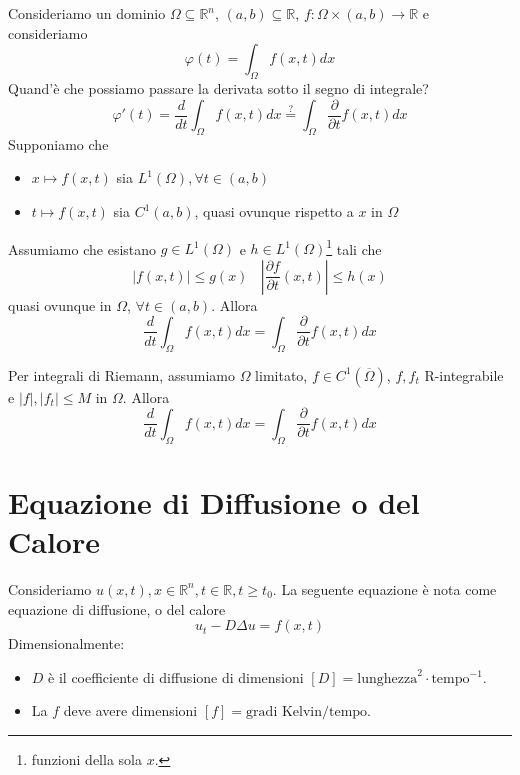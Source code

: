 \documentclass[10pt,a4paper,twoside,openright]{book}
\begin{document}
Consideriamo un dominio $\Omega \subseteq \mathbb{R}^{n}$, $(a,b) \subseteq \mathbb{R}$, $f:\Omega \times (a,b)\rightarrow \mathbb{R}$ e consideriamo
\begin{equation*}
\varphi (t) =\int _{\Omega } f(x,t) dx
\end{equation*}
Quand'è che possiamo passare la derivata sotto il segno di integrale?
\begin{equation*}
\varphi '(t) =\frac{d}{dt}\int _{\Omega } f(x,t) dx\overset{?}{=}\int _{\Omega }\frac{\partial }{\partial t} f(x,t) dx
\end{equation*}
Supponiamo che
\begin{itemize}
\item $\displaystyle x\mapsto f(x,t)$ sia $\displaystyle L^{1}(\Omega),\forall t\in (a,b)$
\item $\displaystyle t\mapsto f(x,t)$ sia $\displaystyle C^{1}(a,b)$, quasi ovunque rispetto a $\displaystyle x$ in $\displaystyle \Omega $
\end{itemize}
\begin{theorem}
Assumiamo che esistano $g\in L^{1}(\Omega)$ e $h\in L^{1}(\Omega)$\footnote{funzioni della sola $x$.} tali che
\begin{equation*}
| f(x,t)| \leqslant g(x) \ \ \ \ \left| \frac{\partial f}{\partial t}(x,t)\right| \leqslant h(x)
\end{equation*}
quasi ovunque in $\displaystyle \Omega $, $\displaystyle \forall t\in (a,b)$. Allora
\begin{equation*}
\frac{d}{dt}\int _{\Omega } f(x,t) dx=\int _{\Omega }\frac{\partial }{\partial t} f(x,t) dx
\end{equation*}
\end{theorem}
Per integrali di Riemann, assumiamo $\Omega $ limitato, $f\in C^{1}(\overline{\Omega })$, $f,f_{t}$ R-integrabile e $| f|,| f_{t}| \leqslant M$ in $\Omega $. Allora
\begin{equation*}
\frac{d}{dt}\int _{\Omega } f(x,t) dx=\int _{\Omega }\frac{\partial }{\partial t} f(x,t) dx
\end{equation*}
\chapter{Equazione di Diffusione o del Calore}

Consideriamo $u(x,t),x\in \mathbb{R}^{n},t\in \mathbb{R},t\geqslant t_{0}$. La seguente equazione è nota come equazione di diffusione, o del calore
\begin{equation*}
\boxed{u_{t} -D\Delta u=f(x,t)}
\end{equation*}
Dimensionalmente:
\begin{itemize}
\item $D$ è il coefficiente di diffusione di dimensioni $[ D] =\text{lunghezza}^{2} \cdotp \text{tempo}^{-1}$.
\item La $f$ deve avere dimensioni $[ f] =\text{gradi Kelvin} /\text{tempo}$.
\end{itemize}
\end{document}
